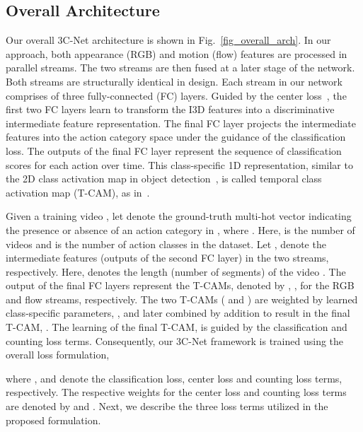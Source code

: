 \documentclass[10pt,twocolumn,letterpaper]{article}
\begin{document}
\subsection{Overall Architecture\label{sec_arch}}
Our overall 3C-Net architecture is shown in Fig.~\ref{fig_overall_arch}. In our approach, both appearance (RGB) and motion (flow) features are processed in parallel streams. The two streams are then fused at a later stage of the network. Both streams are structurally identical in design. Each stream in our network comprises of three fully-connected (FC) layers. Guided by the center loss~\cite{center_loss}, the first two FC layers learn to transform the I3D features into a discriminative
intermediate feature representation. The final FC layer projects the intermediate features into the action category space under the guidance of the classification loss. The outputs of the final FC layer represent the sequence of classification scores for each action over time. This class-specific 1D representation, similar to the 2D class activation map in object detection~\cite{obj-det-cam}, is called temporal class activation map (T-CAM), as in~\cite{stpn}. 


Given a training video , let  denote the ground-truth multi-hot vector indicating the presence or absence of an action category in , where . Here,  is the number of videos and  is the number of action classes in the dataset. Let ,   denote the intermediate features (outputs of the second FC layer) in the two streams, respectively. Here,  denotes the length (number of segments) of the video .  
The output of the final FC layers represent the T-CAMs, denoted by , , for the RGB and flow streams, respectively. 
The two T-CAMs ( and ) are weighted by learned class-specific parameters, , and later combined by addition to result in the final T-CAM, . The learning of the final T-CAM,  is guided by the classification and counting loss terms. 
Consequently, our 3C-Net framework is trained using the overall loss formulation, 
\vspace{-0.1cm}

\noindent where ,  and  denote the classification loss, center loss and counting loss terms, respectively. The respective weights for the center loss and counting loss terms are denoted by  and  . Next, we describe the three loss terms utilized in the proposed formulation.
\end{document}
